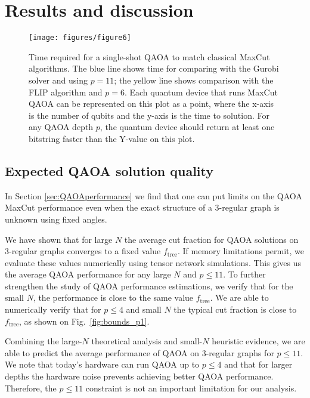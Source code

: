 \documentclass[prb,reprint,nofootinbib,longbibliography,superscriptaddress]{revtex4-1}
\begin{document}
\section{Results and discussion}
\label{sec:results}


\begin{figure}
    \centering
    \texttt{[image: figures/figure6]}
    \caption{
    Time required for a single-shot QAOA to match classical MaxCut algorithms.
    The blue line shows time for comparing with the Gurobi solver and using $p=11$;  the yellow line shows comparison with the FLIP algorithm and $p=6$.
    Each quantum device that runs MaxCut QAOA can be represented on this plot as a point, where the x-axis is the number of qubits and the y-axis is the time to solution. 
    For any QAOA depth $p$, the quantum device should return at least one bitstring faster than the Y-value on this plot.
    }
    \label{fig:adv_freq}
\end{figure}

\subsection{Expected QAOA solution quality}
 In Section \ref{sec:QAOAperformance} we find that one can put limits on the QAOA MaxCut performance even when the exact structure of a 3-regular graph is unknown using fixed angles.

We have shown that for large $N$ the average cut fraction for QAOA solutions on 3-regular graphs converges to a fixed value $f_{\text {tree}}$. If memory limitations permit, we evaluate these values numerically using tensor network simulations. This gives us the average QAOA performance for any large $N$ and $p\leq11$.  To further strengthen the study of QAOA performance estimations, we verify that for the small $N$, the performance is close to the same value $f_{\text{tree}}$. We are able to numerically verify that for $p\leq 4$ and small $N$ the typical cut fraction is close to $f_{\text {tree}}$, as shown on Fig.~\ref{fig:bounds_p1}.

Combining the large-$N$ theoretical analysis and small-$N$ heuristic evidence, we are able to predict the average performance of QAOA on 3-regular graphs for $p\leq11$. We note that today's hardware can run QAOA up to $p\leq4$ \cite{ebadi2022} and that for larger depths the hardware noise prevents achieving better QAOA performance. Therefore, the $p\leq11$ constraint is not an important limitation for our analysis.
\end{document}
